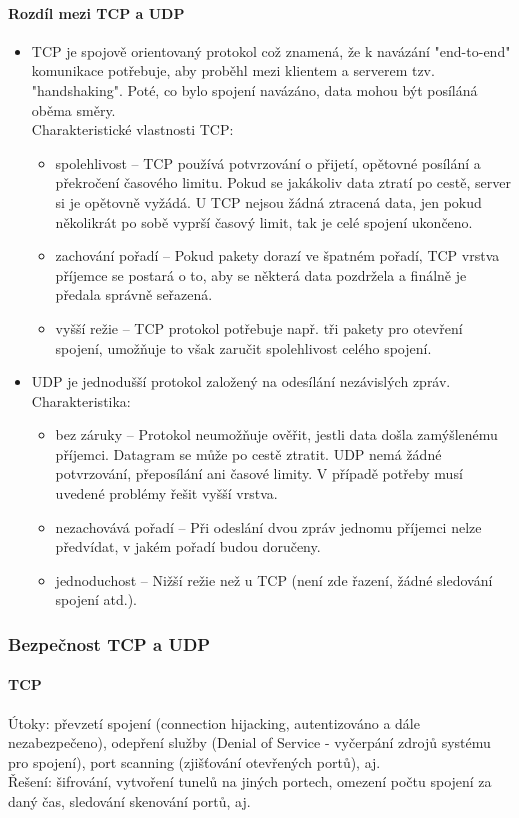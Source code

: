 \documentclass[10pt,a4paper]{article}
\begin{document}
\paragraph{Rozdíl mezi TCP a UDP}
\begin{itemize}
	\item TCP je spojově orientovaný protokol což znamená, že k navázání "end-to-end" komunikace potřebuje, aby proběhl mezi klientem a serverem tzv. "handshaking". Poté, co bylo spojení navázáno, data mohou být posíláná oběma směry.\\
	Charakteristické vlastnosti TCP:
	\begin{itemize}
		\item spolehlivost – TCP používá potvrzování o přijetí, opětovné posílání a překročení časového limitu. Pokud se jakákoliv data ztratí po cestě, server si je opětovně vyžádá. U TCP nejsou žádná ztracená data, jen pokud několikrát po sobě vyprší časový limit, tak je celé spojení ukončeno.
		\item zachování pořadí – Pokud pakety dorazí ve špatném pořadí, TCP vrstva příjemce se postará o to, aby se některá data pozdržela a finálně je předala správně seřazená.
		\item vyšší režie – TCP protokol potřebuje např. tři pakety pro otevření spojení, umožňuje to však zaručit spolehlivost celého spojení.
	\end{itemize}
	\item UDP je jednodušší protokol založený na odesílání nezávislých zpráv. \\
	Charakteristika:
	\begin{itemize}
		\item bez záruky – Protokol neumožňuje ověřit, jestli data došla zamýšlenému příjemci. Datagram se může po cestě ztratit. UDP nemá žádné potvrzování, přeposílání ani časové limity. V případě potřeby musí uvedené problémy řešit vyšší vrstva.
		\item nezachovává pořadí – Při odeslání dvou zpráv jednomu příjemci nelze předvídat, v jakém pořadí budou doručeny.
		\item jednoduchost – Nižší režie než u TCP (není zde řazení, žádné sledování spojení atd.).
	\end{itemize}
\end{itemize}
\subsubsection{Bezpečnost TCP a UDP}
\paragraph{TCP} Útoky: převzetí spojení (connection hijacking, autentizováno a dále nezabezpečeno), odepření služby (Denial of Service - vyčerpání zdrojů systému pro spojení), port scanning (zjišťování otevřených portů), aj. \\
Řešení: šifrování, vytvoření tunelů na jiných portech, omezení počtu spojení za daný čas, sledování skenování portů, aj.
\end{document}
